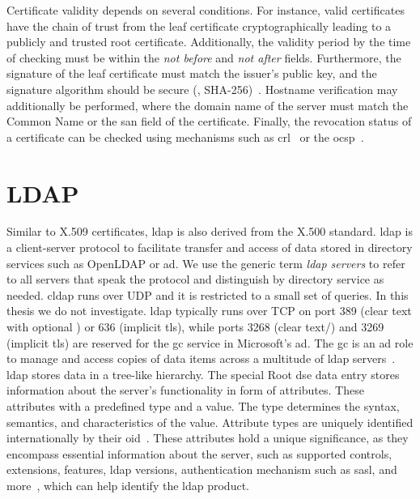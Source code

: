 Certificate validity depends on several conditions.
For instance, valid certificates have the chain of trust from the leaf certificate cryptographically leading to a publicly and trusted root certificate.
Additionally, the validity period by the time of checking must be within the \textit{not before} and \textit{not after} fields.
Furthermore, the signature of the leaf certificate must match the issuer's public key, and the signature algorithm should be secure (\eg, SHA-256)~\cite{X509certinsecuresigningalgorithmBoostSecurity}.
Hostname verification may additionally be performed, where the domain name of the server must match the Common Name or the \gls{san} field of the certificate.
Finally, the revocation status of a certificate can be checked using mechanisms such as \gls{crl}~\cite{rfc5280} or the \gls{ocsp}~\cite{rfc6960}.

\section{LDAP}
\label{sec:background-ldap}
Similar to X.509 certificates, \gls{ldap} is also derived from the X.500 standard.
\acrfull{ldap} is a client-server protocol to facilitate transfer and access of data stored in directory services such as OpenLDAP or \acrfull{ad}.
We use the generic term \textit{\gls{ldap} servers} to refer to all servers that speak the protocol and distinguish by directory service as needed.
\gls{cldap} runs over UDP and it is restricted to a small set of queries.
In this thesis we do not investigate.
\gls{ldap} typically runs over TCP on port 389 (clear text with optional \starttls) or 636 (implicit \gls{tls}), while ports 3268 (clear text/\starttls) and 3269 (implicit \gls{tls}) are reserved for the \gls{gc} service in Microsoft's \gls{ad}.
The \gls{gc} is an \gls{ad} role to manage and access copies of data items across a multitude of \gls{ldap} servers~\cite{alvinashcraft_GlobalCatalogWin32_2020}.
\gls{ldap} stores data in a tree-like hierarchy.
The special Root \gls{dse} data entry stores information about the server's functionality in form of attributes.
These attributes with a predefined type and a value.
The type determines the syntax, semantics, and characteristics of the value.
Attribute types are uniquely identified internationally by their \gls{oid}~\cite{x500standard,x501Standard}.
These attributes hold a unique significance, as they encompass essential information about the server, such as supported controls, extensions, features, \gls{ldap} versions, authentication mechanism such as \gls{sasl}, and more~\cite{LDAP_RFC_Model}, which can help identify the \gls{ldap} product.

